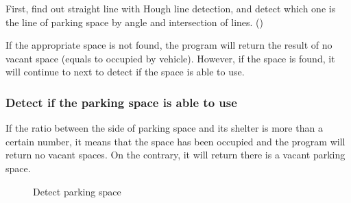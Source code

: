 \documentclass[runningheads,a4paper]{llncs}
\begin{document}
\begin{CJK}{UTF8}{bsmi}
First, find out straight line with Hough line detection, and detect
which one is the line of parking space by angle and intersection of
lines. ()

If the appropriate space is not found, the program will return the
result of no vacant space (equals to occupied by vehicle). However, if
the space is found, it will continue to next to detect if the space is
able to use.

\subsubsection{Detect if the parking space is able to use}

If the ratio between the side of parking space and its shelter is more
than a certain number, it means that the space has been occupied and the
program will return no vacant spaces. On the contrary, it will return
there is a vacant parking space.

\begin{figure}
	\hspace{0.5in}
	\caption{Detect parking space}
	\label{detectingParkingspace}
\end{figure}


\end{CJK}
\end{document}
